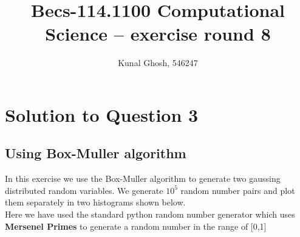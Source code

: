 \documentclass[a4paper,11pt]{article}
\begin{document}
\title{Becs-114.1100 Computational Science -- exercise round 8} %
\author{Kunal Ghosh, 546247} %
\maketitle
\section{Solution to Question 3}
\subsection{Using Box-Muller algorithm}\label{prob3a}
In this exercise we use the Box-Muller algorithm to generate two gaussing distributed random variables. We generate $10^5$ random number pairs and plot them separately in two histograms shown below.\\
Here we have used the standard python random number generator which uses \textbf{Mersenel Primes} to generate a random number in the range of [0,1]
\end{document}
